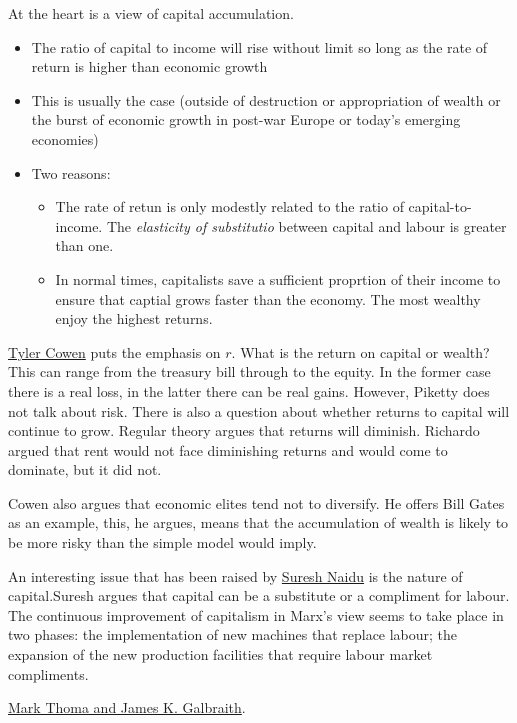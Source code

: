 \documentclass[12pt, a4paper, oneside]{article} %
\begin{document}
At the heart is a view of capital accumulation. 
\begin{itemize}
\item The ratio of capital to income will rise without limit so long as the rate of return is higher than economic growth
\item This is usually the case (outside of destruction or appropriation of wealth or the burst of economic growth in post-war Europe or today's emerging economies)
\item Two reasons: 
\begin{itemize}
\item The rate of retun is only modestly related to the ratio of capital-to-income.  The \emph{elasticity of substitutio} between capital and labour is greater than one.  
\item In normal times, capitalists save a sufficient proprtion of their income to ensure that captial grows faster than the economy.  The most wealthy enjoy the highest returns.
\end{itemize}
\end{itemize}

\href{http://www.foreignaffairs.com/articles/141218/tyler-cowen/capital-punishment}{Tyler Cowen} puts the emphasis on $r$.  What is the return on capital or wealth?  This can range from the treasury bill through to the equity.  In the former case there is a real loss, in the latter there can be real gains.  However, Piketty does not talk about risk.  There is also a question about whether returns to capital will continue to grow.  Regular theory argues that returns will diminish. Richardo argued that rent would not face diminishing returns and would come to dominate, but it did not. 

Cowen  also argues that economic elites tend not to diversify.  He offers Bill Gates as an example, this, he argues, means that the accumulation of wealth is likely to be more risky than the simple model would imply. 

An interesting issue that has been raised by \href{http://slackwire.blogspot.com/2014/04/substitutes-or-complements-marx-and.html}{Suresh Naidu} is the nature of capital.Suresh argues that capital can be a substitute or a compliment for labour. The continuous improvement of capitalism in Marx's view seems to take place in two phases:  the implementation of new machines that replace labour; the expansion of the new production facilities that require labour market compliments.   

\href{http://economistsview.typepad.com/economistsview/2014/05/unpacking-the-first-fundamental-law.html}{Mark Thoma and James K. Galbraith}.  
\end{document}
